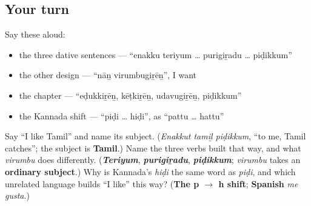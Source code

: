 \subsection*{Your turn}
Say these aloud:

\begin{itemize}
\raggedright
  \item the three dative sentences — \textquotedblleft{}enakku teriyum … purigiṟadu … piḍikkum\textquotedblright{}
  \item the other design — \textquotedblleft{}nāṉ virumbugiṟēṉ\textquotedblright{}, I want
  \item the chapter — \textquotedblleft{}eḍukkiṟēṉ, kēṭkiṟēṉ, udavugiṟēṉ, piḍikkum\textquotedblright{}
  \item the Kannada shift — \textquotedblleft{}piḍi … hiḍi\textquotedblright{}, as \textquotedblleft{}pattu … hattu\textquotedblright{}
\end{itemize}

\begin{tcolorbox}[breakable,colback=teal!4,colframe=teal!35!black,title={Before you move on}]
Say \textquotedblleft{}I like Tamil\textquotedblright{} and name its subject. (\emph{Enakkut tamiḻ piḍikkum}, \textquotedblleft{}to me, Tamil catches\textquotedblright{}; the subject is \textbf{Tamil}.) Name the three verbs built that way, and what \emph{virumbu} does differently. (\emph{\textbf{Teriyum}}, \emph{\textbf{purigiṟadu}}, \emph{\textbf{piḍikkum}}; \emph{virumbu} takes an \textbf{ordinary subject}.) Why is Kannada's \emph{hiḍi} the same word as \emph{piḍi}, and which unrelated language builds \textquotedblleft{}I like\textquotedblright{} this way? (\textbf{The p $\to$ h shift}; \textbf{Spanish} \emph{me gusta}.)
\end{tcolorbox}
